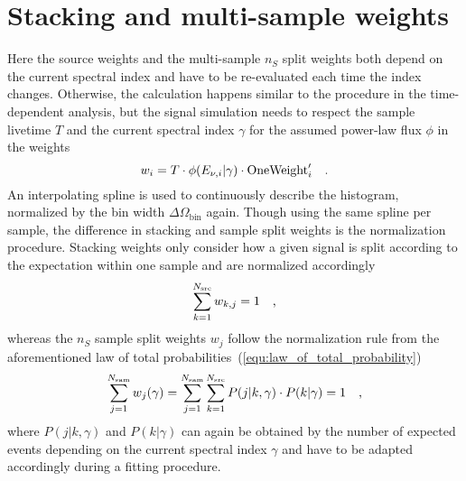 \section{Stacking and multi-sample weights}
Here the source weights and the multi-sample $n_S$ split weights both depend on the current spectral index and have to be re-evaluated each time the index changes.
Otherwise, the calculation happens similar to the procedure in the time-dependent analysis, but the signal simulation needs to respect the sample livetime $T$ and the current spectral index $\gamma$ for the assumed power-law flux $\phi$ in the weights
\begin{equation}
  w_i = T\cdot \phi(E_{\nu,i}|\gamma)\cdot\text{OneWeight}'_i
  \quad\text{.}
\end{equation}
An interpolating spline is used to continuously describe the histogram, normalized by the bin width $\Delta\Omega_\text{bin}$ again.
Though using the same spline per sample, the difference in stacking and sample split weights is the normalization procedure.
Stacking weights only consider how a given signal is split according to the expectation within one sample and are normalized accordingly
\begin{equation}
  \sum_{k=1}^{N_\text{src}} w_{k,j} = 1
  \quad\text{,}
\end{equation}
whereas the $n_S$ sample split weights $w_j$ follow the normalization rule from the aforementioned law of total probabilities~(\ref{equ:law_of_total_probability})
\begin{equation}
  \sum_{j=1}^{N_\text{sam}} w_j(\gamma)
  = \sum_{j=1}^{N_\text{sam}} \sum_{k=1}^{N_\text{src}}
      P(j|k,\gamma)\cdot P(k|\gamma) = 1
  \quad\text{,}
\end{equation}
where $P(j|k,\gamma)$ and $P(k|\gamma)$ can again be obtained by the number of expected events depending on the current spectral index $\gamma$ and have to be adapted accordingly during a fitting procedure.


